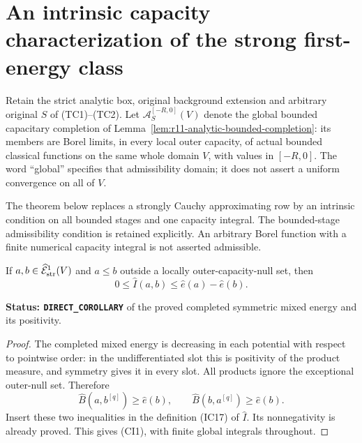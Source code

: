\section{An intrinsic capacity characterization of the strong first-energy class}
\label{sec:r11-intrinsic-first-energy-characterization}

Retain the strict analytic box, original background extension and
arbitrary original $S$ of (TC1)--(TC2). Let
$\mathcal A_S^{[-R,0]}(V)$ denote the global bounded capacitary
completion of Lemma~\ref{lem:r11-analytic-bounded-completion}:
its members are Borel limits, in every local outer capacity,
of actual bounded classical functions on the same whole domain
$V$, with values in $[-R,0]$.
The word ``global'' specifies that admissibility domain; it
does not assert a uniform convergence on all of $V$.

The theorem below replaces a strongly Cauchy approximating row
by an intrinsic condition on all bounded stages and one
capacity integral. The bounded-stage admissibility condition
is retained explicitly. An arbitrary Borel function with a
finite numerical capacity integral is not asserted admissible.

\begin{lemma}
\label{lem:r11-ordered-completed-discrepancy}
If $a,b\in\widehat{\mathcal E}^1_{\rm str}(V)$ and
$a\leq b$ outside a locally outer-capacity-null set, then
\[
       0\leq\widehat I(a,b)
                            \leq\widehat e(a)-\widehat e(b).
 \tag{CI1}
\]
\end{lemma}

\noindent\textbf{Status: \texttt{DIRECT\_COROLLARY}} of the
proved completed symmetric mixed energy and its positivity.

\begin{proof}
The completed mixed energy is decreasing in each potential
with respect to pointwise order: in the undifferentiated
slot this is positivity of the product measure, and symmetry
gives it in every slot. All products ignore the exceptional
outer-null set. Therefore
\[
       \widehat B(a,b^{[q]})\geq\widehat e(b),\qquad
       \widehat B(b,a^{[q]})\geq\widehat e(b).
\]
Insert these two inequalities in the definition (IC17) of
$\widehat I$. Its nonnegativity is already proved. This gives
(CI1), with finite global integrals throughout.
\end{proof}

